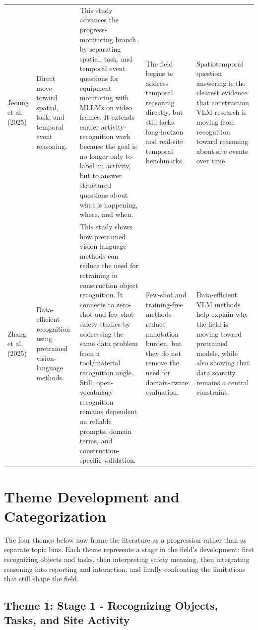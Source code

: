 \documentclass[10pt, letterpaper]{article}
\begin{document}
\begin{landscape}
\begin{longtable}{L{2.7cm} L{3.2cm} L{6.2cm} L{4.9cm} L{5.1cm}}
Jeoung et al. (2025) & Direct move toward spatial, task, and temporal event reasoning. & This study advances the progress-monitoring branch by separating spatial, task, and temporal event questions for equipment monitoring with MLLMs on video frames. It extends earlier activity-recognition work because the goal is no longer only to label an activity, but to answer structured questions about what is happening, where, and when. & The field begins to address temporal reasoning directly, but still lacks long-horizon and real-site temporal benchmarks. & Spatiotemporal question answering is the clearest evidence that construction VLM research is moving from recognition toward reasoning about site events over time. \\

Zhang et al. (2025) & Data-efficient recognition using pretrained vision-language methods. & This study shows how pretrained vision-language methods can reduce the need for retraining in construction object recognition. It connects to zero-shot and few-shot safety studies by addressing the same data problem from a tool/material recognition angle. Still, open-vocabulary recognition remains dependent on reliable prompts, domain terms, and construction-specific validation. & Few-shot and training-free methods reduce annotation burden, but they do not remove the need for domain-aware evaluation. & Data-efficient VLM methods help explain why the field is moving toward pretrained models, while also showing that data scarcity remains a central constraint. \\

\end{longtable}
\end{landscape}

\section{Theme Development and Categorization}

The four themes below now frame the literature as a progression rather than as separate topic bins. Each theme represents a stage in the field's development: first recognizing objects and tasks, then interpreting safety meaning, then integrating reasoning into reporting and interaction, and finally confronting the limitations that still shape the field.

\subsection{Theme 1: Stage 1 - Recognizing Objects, Tasks, and Site Activity}
\end{document}
